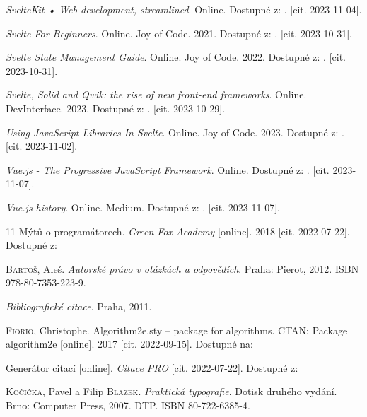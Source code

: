 \begin{thebibliography}{99}
\emph{SvelteKit • Web development, streamlined}. Online. Dostupné z: . [cit. 2023-11-04].

\emph{Svelte For Beginners}. Online. Joy of Code. 2021. Dostupné z: . [cit. 2023-10-31].

\emph{Svelte State Management Guide}. Online. Joy of Code. 2022. Dostupné z: . [cit. 2023-10-31].

\emph{Svelte, Solid and Qwik: the rise of new front-end frameworks}. Online. DevInterface. 2023. Dostupné z: . [cit. 2023-10-29].

\emph{Using JavaScript Libraries In Svelte}. Online. Joy of Code. 2023. Dostupné z: . [cit. 2023-11-02].

\emph{Vue.js - The Progressive JavaScript Framework}. Online. Dostupné z: . [cit. 2023-11-07].

\emph{Vue.js history}. Online. Medium. Dostupné z: . [cit. 2023-11-07].



11 Mýtů o programátorech. \emph{Green Fox Academy} [online]. 2018 [cit. 2022-07-22]. Dostupné z: 

\textsc{Bartoš}, Aleš. \emph{Autorské právo v otázkách a odpovědích}. Praha: Pierot, 2012. ISBN 978-80-7353-223-9.

\emph{Bibliografické citace}. Praha, 2011.

\textsc{Fiorio}, Christophe. Algorithm2e.sty -- package for algorithms. CTAN: Package algorithm2e [online]. 2017 [cit. 2022-09-15]. Dostupné na: 

Generátor citací [online]. \emph{Citace PRO} [cit. 2022-07-22]. Dostupné z: 

\textsc{Kočička}, Pavel a Filip \textsc{Blažek}. \emph{Praktická typografie}. Dotisk druhého vydání. Brno: Computer Press, 2007. DTP. ISBN 80-722-6385-4.



\end{thebibliography}
